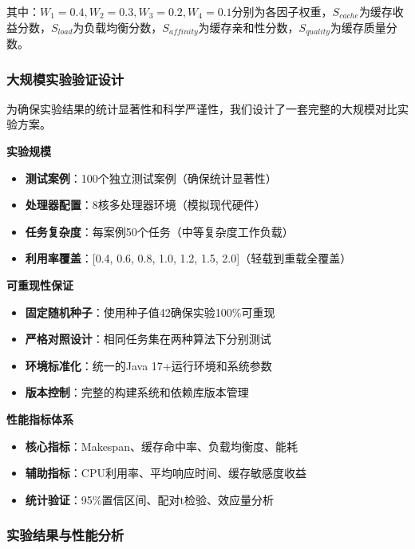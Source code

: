 其中：$W_1=0.4, W_2=0.3, W_3=0.2, W_4=0.1$分别为各因子权重，$S_{cache}$为缓存收益分数，$S_{load}$为负载均衡分数，$S_{affinity}$为缓存亲和性分数，$S_{quality}$为缓存质量分数。

\subsubsection{大规模实验验证设计}

为确保实验结果的统计显著性和科学严谨性，我们设计了一套完整的大规模对比实验方案。

\begin{tcolorbox}[
    colback=orange!5!white,
    colframe=orange!50!black,
    title=\textbf{实验设计严谨性保障},
    fonttitle=\bfseries,
    arc=3pt
]
\textbf{实验规模}
\begin{itemize}
    \item \textbf{测试案例}：100个独立测试案例（确保统计显著性）
    \item \textbf{处理器配置}：8核多处理器环境（模拟现代硬件）
    \item \textbf{任务复杂度}：每案例50个任务（中等复杂度工作负载）
    \item \textbf{利用率覆盖}：[0.4, 0.6, 0.8, 1.0, 1.2, 1.5, 2.0]（轻载到重载全覆盖）
\end{itemize}

\textbf{可重现性保证}
\begin{itemize}
    \item \textbf{固定随机种子}：使用种子值42确保实验100\%可重现
    \item \textbf{严格对照设计}：相同任务集在两种算法下分别测试
    \item \textbf{环境标准化}：统一的Java 17+运行环境和系统参数
    \item \textbf{版本控制}：完整的构建系统和依赖库版本管理
\end{itemize}

\textbf{性能指标体系}
\begin{itemize}
    \item \textbf{核心指标}：Makespan、缓存命中率、负载均衡度、能耗
    \item \textbf{辅助指标}：CPU利用率、平均响应时间、缓存敏感度收益
    \item \textbf{统计验证}：95\%置信区间、配对t检验、效应量分析
\end{itemize}
\end{tcolorbox}

\subsubsection{实验结果与性能分析}

